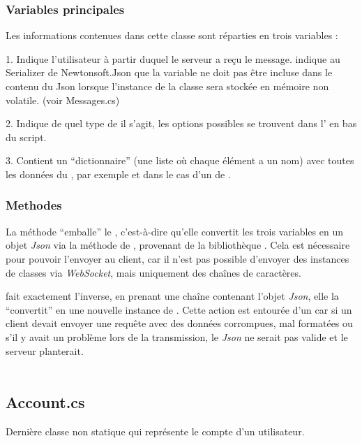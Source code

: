 \documentclass{article}
\begin{document}
\subsubsection{Variables principales}
Les informations contenues dans cette classe sont réparties en trois variables :

1. Indique l'utilisateur à partir duquel le serveur a reçu le message. 
\code{[JsonIgnore]} indique au Serializer de Newtonsoft.Json que la variable ne doit pas être incluse dans le contenu du Json lorsque l'instance de la classe sera stockée en mémoire non volatile. (voir Messages.cs)

2. Indique de quel type de  il s'agit, les options possibles se trouvent dans l’  en bas du script.

3. Contient un “dictionnaire” (une liste où chaque élément a un nom) avec toutes les données du , par exemple  et  dans le cas d'un  de  .

\subsubsection{Methodes}
La méthode  “emballe” le , c'est-à-dire qu'elle convertit les trois variables en un objet \textit{Json} via la méthode  de , provenant de la bibliothèque . Cela est nécessaire pour pouvoir l'envoyer au client, car il n'est pas possible d'envoyer des instances de classes via \textit{WebSocket}, mais uniquement des chaînes de caractères.

 fait exactement l'inverse, en prenant une chaîne contenant l'objet \textit{Json}, elle la “convertit” en une nouvelle instance de . Cette action est entourée d'un  car si un client devait envoyer une requête avec des données corrompues, mal formatées ou s'il y avait un problème lors de la transmission, le \textit{Json} ne serait pas valide et le serveur planterait.
\\\\
\subsection{Account.cs}
Dernière classe non statique qui représente le compte d'un utilisateur.
\end{document}
